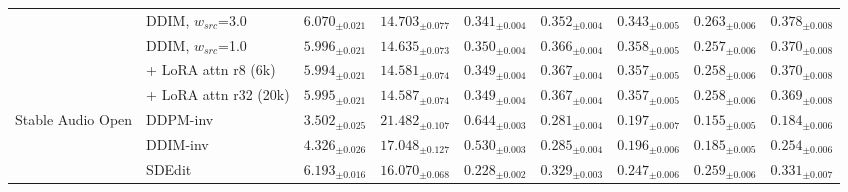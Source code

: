 \begin{table}[t]
\begin{tabular}{ll ccc cccc}
      & DDIM, $w_{src}$=3.0 & $6.070_{\pm 0.021}$ & $\mathbf{14.703}_{\pm 0.077}$ & $0.341_{\pm 0.004}$ & $0.352_{\pm 0.004}$ & $0.343_{\pm 0.005}$ & $\mathbf{0.263}_{\pm 0.006}$ & $\mathbf{0.378}_{\pm 0.008}$ \\
      & DDIM, $w_{src}$=1.0 & $5.996_{\pm 0.021}$ & $14.635_{\pm 0.073}$ & $\mathbf{0.350}_{\pm 0.004}$ & $0.366_{\pm 0.004}$ & $\mathbf{0.358}_{\pm 0.005}$ & $0.257_{\pm 0.006}$ & $0.370_{\pm 0.008}$ \\
      & + LoRA attn r8 (6k) & $\mathbf{5.994}_{\pm 0.021}$ & $14.581_{\pm 0.074}$ & $0.349_{\pm 0.004}$ & $\mathbf{0.367}_{\pm 0.004}$ & $0.357_{\pm 0.005}$ & $0.258_{\pm 0.006}$ & $0.370_{\pm 0.008}$ \\
      & + LoRA attn r32 (20k) & $5.995_{\pm 0.021}$ & $14.587_{\pm 0.074}$ & $0.349_{\pm 0.004}$ & $0.367_{\pm 0.004}$ & $0.357_{\pm 0.005}$ & $0.258_{\pm 0.006}$ & $0.369_{\pm 0.008}$ \\
    \midrule
    \multirow{3}{*}{Stable Audio Open}
      & DDPM-inv & $\mathbf{3.502}_{\pm 0.025}$ & $\mathbf{21.482}_{\pm 0.107}$ & $\mathbf{0.644}_{\pm 0.003}$ & $0.281_{\pm 0.004}$ & $0.197_{\pm 0.007}$ & $0.155_{\pm 0.005}$ & $0.184_{\pm 0.006}$ \\
      & DDIM-inv & $4.326_{\pm 0.026}$ & $17.048_{\pm 0.127}$ & $0.530_{\pm 0.003}$ & $0.285_{\pm 0.004}$ & $0.196_{\pm 0.006}$ & $0.185_{\pm 0.005}$ & $0.254_{\pm 0.006}$ \\
      & SDEdit   & $6.193_{\pm 0.016}$ & $16.070_{\pm 0.068}$ & $0.228_{\pm 0.002}$ & $\mathbf{0.329}_{\pm 0.003}$ & $\mathbf{0.247}_{\pm 0.006}$ & $\mathbf{0.259}_{\pm 0.006}$ & $\mathbf{0.331}_{\pm 0.007}$ \\
    \bottomrule
  \end{tabular}
\end{table}
